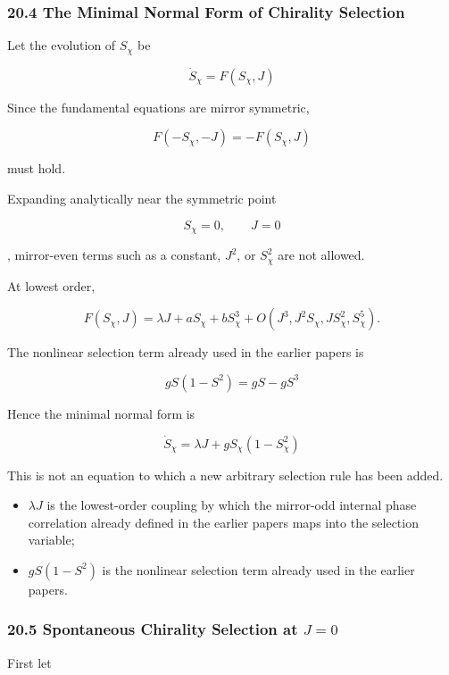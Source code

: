 \documentclass[
  a4paper,
]{article}
\providecommand{\tightlist}{%
  \setlength{\itemsep}{0pt}\setlength{\parskip}{0pt}}
\begin{document}
\subsubsection{20.4 The Minimal Normal Form of Chirality
Selection}\label{the-minimal-normal-form-of-chirality-selection}

Let the evolution of \(S_\chi\) be

\[
\dot S_\chi
=
F(S_\chi,J)
\]

Since the fundamental equations are mirror symmetric,

\[
\boxed{
F(-S_\chi,-J)
=
-F(S_\chi,J)
}
\tag{160}
\]

must hold.

Expanding analytically near the symmetric point

\[
S_\chi=0,
\qquad
J=0
\]

, mirror-even terms such as a constant, \(J^2\), or \(S_\chi^2\) are not
allowed.

At lowest order,

\[
F(S_\chi,J)
=
\lambda J
+
aS_\chi
+
bS_\chi^3
+
O(J^3,J^2S_\chi,JS_\chi^2,S_\chi^5).
\tag{161}
\]

The nonlinear selection term already used in the earlier papers is

\[
gS(1-S^2)
=
gS-gS^3
\]

Hence the minimal normal form is

\[
\boxed{
\dot S_\chi
=
\lambda J
+
gS_\chi
\left(
1-S_\chi^2
\right)
}
\tag{162}
\]

This is not an equation to which a new arbitrary selection rule has been
added.

\begin{itemize}
\tightlist
\item
  \(\lambda J\) is the lowest-order coupling by which the mirror-odd
  internal phase correlation already defined in the earlier papers maps
  into the selection variable;
\item
  \(gS(1-S^2)\) is the nonlinear selection term already used in the
  earlier papers.
\end{itemize}

\subsubsection{\texorpdfstring{20.5 Spontaneous Chirality Selection at
\(J=0\)}{20.5 Spontaneous Chirality Selection at J=0}}\label{spontaneous-chirality-selection-at-j0}

First let
\end{document}
